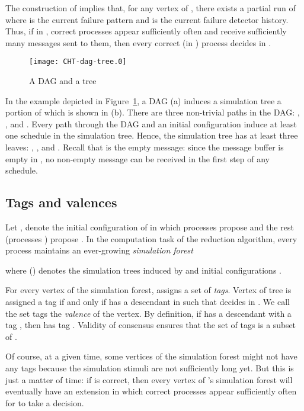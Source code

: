 \documentclass[11pt]{article}
\def\fd{failure detector}
\begin{document}
The construction of  implies that, for any vertex  of ,
	there exists a partial run
	 of  where  is the current failure pattern and
	 is the current {\fd} history.
Thus, if in , correct processes appear sufficiently often
	and receive sufficiently many messages sent to them,
	then every correct (in ) process decides in .

\begin{figure}[htbp]
  \centering
  \texttt{[image: CHT-dag-tree.0]}
  \caption{A DAG and a tree}
  \label{fig:dag-tree}
\end{figure}

In the example depicted in Figure~\ref{fig:dag-tree},
	a DAG (a) induces a simulation tree a portion of which is shown in (b).
There are three non-trivial paths in the DAG: ,
	, 
	and .
Every path through the DAG and an initial configuration 
	induce at least one schedule in the simulation tree.
Hence, the simulation tree has at least three leaves:
	  ,  , and
	.
Recall that  is the empty message: since the message buffer is empty in ,
	no non-empty message can be received in the first step of any schedule.

\subsection{Tags and valences}
\label{subsec:cht:valence}


Let ,  denote the initial configuration of 
	in which processes  propose  and the rest (processes
	) propose .
In the computation task of the reduction algorithm, every process
	 maintains an ever-growing \emph{simulation forest}
	
	where  () denotes
	the simulation trees induced by  and initial configurations
	.

For every vertex of the simulation forest, 
	assigns a set of \emph{tags}.
Vertex  of tree  is assigned a tag  if and only if
	 has a descendant  in  such that
	 decides  in .
We call the set tags the \emph{valence} of the vertex.
By definition, if  has a descendant with a tag , then  has tag .
Validity of consensus ensures that the set of tags is a subset of .


Of course, at a given time, some vertices of the simulation forest  might not have
	any tags because the simulation stimuli are not sufficiently long yet.
But this is just a matter of time: if  is correct, then
	every vertex of 's simulation forest will eventually have an extension	
	in which correct processes appear sufficiently often for 
	to take a decision.
	
\end{document}
